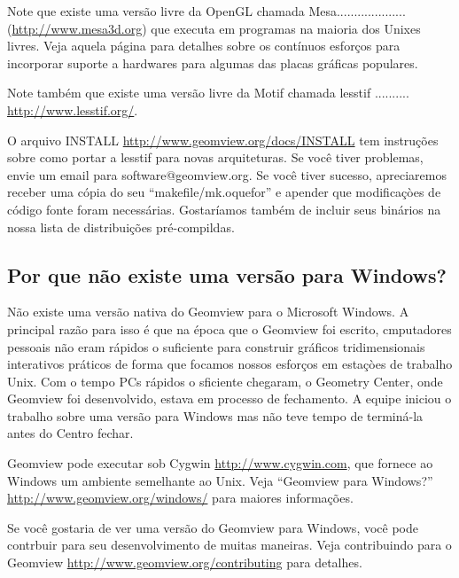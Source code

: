 \documentclass[12pt,a4paper]{article}
\begin{document}
        Note que existe uma vers\~ao livre da OpenGL chamada Mesa....................\\
        (\url{http://www.mesa3d.org})
        que executa em programas na maioria dos Unixes livres.
        Veja aquela p\'agina para detalhes sobre os cont\'inuos esfor\c{c}os para incorporar
        suporte a hardwares para algumas das placas gr\'aficas populares.

        Note tamb\'em que existe uma vers\~ao livre da Motif chamada lesstif ..........
        \url{http://www.lesstif.org/}.

        O arquivo INSTALL \url{http://www.geomview.org/docs/INSTALL} tem instru\c{c}\~oes
        sobre como portar a lesstif para novas arquiteturas. Se voc\^e tiver problemas, envie um email para
        software@geomview.org. Se voc\^e tiver sucesso,
        apreciaremos receber uma c\'{o}pia do seu ``makefile/mk.oquefor'' e
        apender que modifica\c{c}òes de c\'{o}digo fonte foram necess\'arias. Gostar\'iamos tamb\'em
        de incluir seus bin\'arios na nossa lista de distribui\c{c}\~oes pr\'e-compildas.

    \subsection{Por que n\~ao existe uma vers\~ao para Windows?}

        N\~ao existe uma vers\~ao nativa do Geomview para o Microsoft Windows. A
        principal raz\~ao para isso \'e que na \'epoca que o Geomview foi escrito,
        cmputadores pessoais n\~ao eram r\'apidos o suficiente para construir gr\'aficos tridimensionais interativos
        pr\'aticos de forma que focamos nossos esfor\c{c}os em esta\c{c}òes de trabalho Unix. Com o tempo
        PCs r\'apidos o sficiente chegaram, o Geometry Center, onde Geomview foi
        desenvolvido, estava em processo de fechamento. A equipe iniciou o trabalho sobre uma
        vers\~ao para Windows mas n\~ao teve tempo de termin\'a-la antes do Centro
        fechar.

        Geomview pode executar sob Cygwin \url{http://www.cygwin.com}, que fornece
        ao Windows um ambiente semelhante ao Unix. Veja ``Geomview para Windows?''
        \url{http://www.geomview.org/windows/} para maiores informa\c{c}\~oes.

        Se voc\^e gostaria de ver uma vers\~ao do Geomview para Windows, voc\^e pode
        contrbuir para seu desenvolvimento de muitas maneiras. Veja contribuindo para o
        Geomview \url{http://www.geomview.org/contributing} para detalhes.
\end{document}
